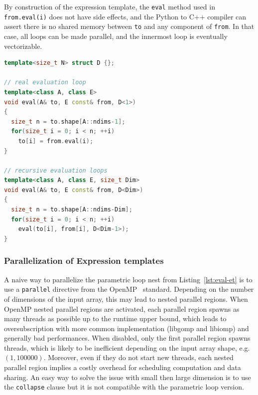 \documentclass[10pt, preprint]{sigplanconf}
\begin{document}
By construction of the expression template, the \texttt{eval} method used in
\texttt{from.eval(i)} does not have side effects, and the Python to C++
compiler can assert there is no shared memory between \texttt{to} and any
component of \texttt{from}. In that case, all loops can be made parallel, and
the innermost loop is eventually vectorizable.

\begin{lstlisting}[language=c++, label={lst:eval-et}, caption={Evaluation body of an expression template}]
template<size_t N> struct D {};

// real evaluation loop
template<class A, class E>
void eval(A& to, E const& from, D<1>)
{
  size_t n = to.shape[A::ndims-1];
  for(size_t i = 0; i < n; ++i)
    to[i] = from.eval(i);
}

// recursive evaluation loops
template<class A, class E, size_t Dim>
void eval(A& to, E const& from, D<Dim>)
{
  size_t n = to.shape[A::ndims-Dim];
  for(size_t i = 0; i < n; ++i)
    eval(to[i], from[i], D<Dim-1>);
}
\end{lstlisting}

\subsubsection{Parallelization of Expression templates}

A naive way to parallelize the parametric loop nest from
Listing~\ref{lst:eval-et} is to use a \texttt{parallel} directive from the
OpenMP~\cite{openmp4} standard. Depending on the number of dimensions of the
input array, this may lead to nested parallel regions. When OpenMP nested
parallel regions are activated, each parallel region spawns as many threads as
possible up to the runtime upper bound, which leads to oversubscription with
more common implementation (libgomp and libiomp) and generally bad performances. When
disabled, only the first parallel region spawns threads, which is likely to be
inefficient depending on the input array shape, e.g. $(1,100000)$. Moreover,
even if they do not start new threads, each nested parallel region implies a
costly overhead for scheduling computation and data sharing. An easy way to solve
the issue with small then large dimension is to use the \texttt{collapse}
clause but it is not compatible with the parametric loop version.
\end{document}
